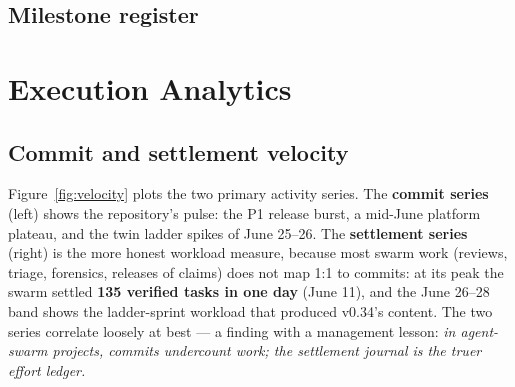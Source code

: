 \subsection{Milestone register}

\begin{table}[h]
\centering
\small
{}
\caption{Milestone register. Every milestone carries its own verification artefact --- the project's ``definition of done'' requires a recomputable or executable proof, not a status-meeting assertion.}
\label{tab:milestones}
\end{table}

\section{Execution Analytics}

\subsection{Commit and settlement velocity}

Figure~\ref{fig:velocity} plots the two primary activity series. The \textbf{commit series} (left) shows the repository's pulse: the P1 release burst, a mid-June platform plateau, and the twin ladder spikes of June 25--26. The \textbf{settlement series} (right) is the more honest workload measure, because most swarm work (reviews, triage, forensics, releases of claims) does not map 1:1 to commits: at its peak the swarm settled \textbf{135 verified tasks in one day} (June 11), and the June 26--28 band shows the ladder-sprint workload that produced v0.34's content. The two series correlate loosely at best --- a finding with a management lesson: \emph{in agent-swarm projects, commits undercount work; the settlement journal is the truer effort ledger.}

